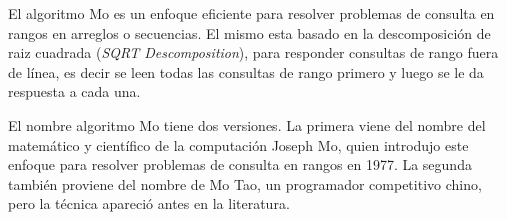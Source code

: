 El algoritmo Mo es un enfoque eficiente para resolver problemas de consulta en rangos en arreglos o secuencias. El mismo esta basado en la descomposición de raiz cuadrada (\emph{SQRT Descomposition}), para responder consultas de rango fuera de línea, es decir se leen todas las consultas de rango primero y luego se le da respuesta a cada una.

El nombre algoritmo Mo tiene dos versiones. La primera viene del nombre del matemático y científico de la computación Joseph Mo, quien introdujo este enfoque para resolver problemas de consulta en rangos en 1977. La segunda también proviene del nombre de Mo Tao, un programador competitivo chino, pero la técnica apareció antes en la literatura. 
